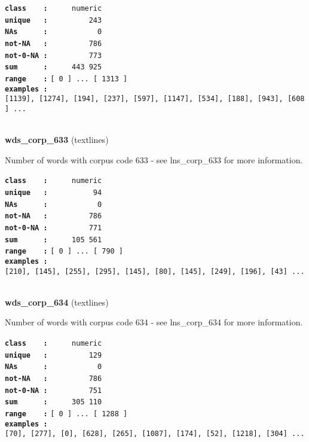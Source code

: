 \documentclass[]{article}
\begin{document}
\textbf{\texttt{class\ \ \ \ :}} \texttt{~~~~~numeric}\\
\textbf{\texttt{unique\ \ \ :}} \texttt{~~~~~~~~~243}\\
\textbf{\texttt{NAs\ \ \ \ \ \ :}} \texttt{~~~~~~~~~~~0}\\
\textbf{\texttt{not-NA\ \ \ :}} \texttt{~~~~~~~~~786}\\
\textbf{\texttt{not-0-NA\ :}} \texttt{~~~~~~~~~773}\\
\textbf{\texttt{sum\ \ \ \ \ \ :}} \texttt{~~~~~443~925}\\
\textbf{\texttt{range\ \ \ \ :}}
\texttt{{[}\ 0\ {]}\ ...\ {[}\ 1313\ {]}}\\
\textbf{\texttt{examples\ :}}
\texttt{{[}1139{]},\ {[}1274{]},\ {[}194{]},\ {[}237{]},\ {[}597{]},\ {[}1147{]},\ {[}534{]},\ {[}188{]},\ {[}943{]},\ {[}608{]}\ ...}\\

~

\textbf{wds\_corp\_633} (textlines)

Number of words with corpus code 633 - see lns\_corp\_633 for more
information.

\textbf{\texttt{class\ \ \ \ :}} \texttt{~~~~~numeric}\\
\textbf{\texttt{unique\ \ \ :}} \texttt{~~~~~~~~~~94}\\
\textbf{\texttt{NAs\ \ \ \ \ \ :}} \texttt{~~~~~~~~~~~0}\\
\textbf{\texttt{not-NA\ \ \ :}} \texttt{~~~~~~~~~786}\\
\textbf{\texttt{not-0-NA\ :}} \texttt{~~~~~~~~~771}\\
\textbf{\texttt{sum\ \ \ \ \ \ :}} \texttt{~~~~~105~561}\\
\textbf{\texttt{range\ \ \ \ :}}
\texttt{{[}\ 0\ {]}\ ...\ {[}\ 790\ {]}}\\
\textbf{\texttt{examples\ :}}
\texttt{{[}210{]},\ {[}145{]},\ {[}255{]},\ {[}295{]},\ {[}145{]},\ {[}80{]},\ {[}145{]},\ {[}249{]},\ {[}196{]},\ {[}43{]}\ ...}\\

~

\textbf{wds\_corp\_634} (textlines)

Number of words with corpus code 634 - see lns\_corp\_634 for more
information.

\textbf{\texttt{class\ \ \ \ :}} \texttt{~~~~~numeric}\\
\textbf{\texttt{unique\ \ \ :}} \texttt{~~~~~~~~~129}\\
\textbf{\texttt{NAs\ \ \ \ \ \ :}} \texttt{~~~~~~~~~~~0}\\
\textbf{\texttt{not-NA\ \ \ :}} \texttt{~~~~~~~~~786}\\
\textbf{\texttt{not-0-NA\ :}} \texttt{~~~~~~~~~751}\\
\textbf{\texttt{sum\ \ \ \ \ \ :}} \texttt{~~~~~305~110}\\
\textbf{\texttt{range\ \ \ \ :}}
\texttt{{[}\ 0\ {]}\ ...\ {[}\ 1288\ {]}}\\
\textbf{\texttt{examples\ :}}
\texttt{{[}70{]},\ {[}277{]},\ {[}0{]},\ {[}628{]},\ {[}265{]},\ {[}1087{]},\ {[}174{]},\ {[}52{]},\ {[}1218{]},\ {[}304{]}\ ...}\\
\end{document}
